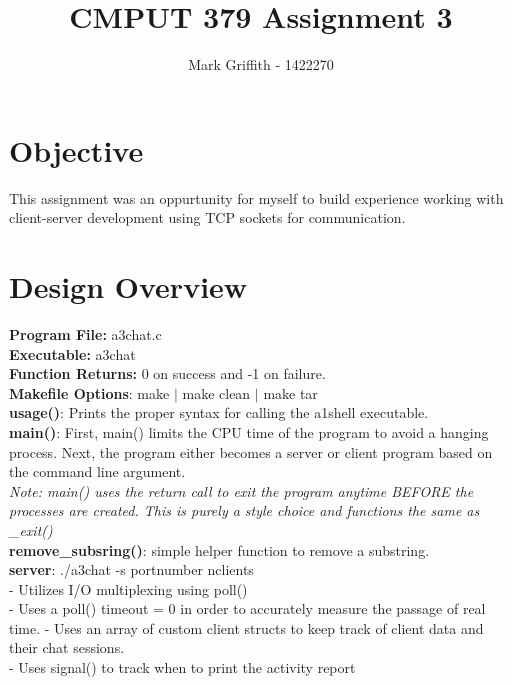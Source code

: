 \documentclass{article}
\begin{document}
\title{CMPUT 379 Assignment 3}
\author{Mark Griffith - 1422270}

\maketitle

\section{Objective}
This assignment was an oppurtunity for myself to build experience
working with client-server development using TCP sockets for
communication.

\section{Design Overview}

\textbf{Program File:} a3chat.c \\
\textbf{Executable:} a3chat \\
\textbf{Function Returns:} 0 on success and -1 on failure. \\
\textbf{Makefile Options}: make $|$ make clean $|$ make tar \\

\noindent
\textbf{usage()}: Prints the proper syntax for calling the a1shell executable. \\

\noindent
\textbf{main()}: First, main() limits the CPU time of the program to avoid a hanging
process.
Next, the program either becomes a server or client program based
on the command line argument. \\

\noindent
\textit{Note: main() uses the return call to exit the program anytime BEFORE the processes
are created. This is purely a style choice and functions the same as \_exit()} \\

\noindent
\textbf{remove\_subsring()}: simple helper function to remove a substring. \\

\noindent
\textbf{server}: ./a3chat -s portnumber nclients \\
- Utilizes I/O multiplexing using poll()\\
- Uses a poll() timeout = 0 in order to accurately measure
the passage of real time.
- Uses an array of custom client structs to keep track
of client data and their chat sessions. \\
- Uses signal() to track when to print the activity report \\
\end{document}
